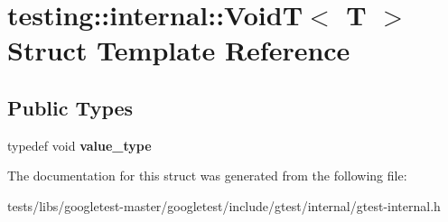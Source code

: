 \hypertarget{structtesting_1_1internal_1_1VoidT}{}\section{testing\+:\+:internal\+:\+:VoidT$<$ T $>$ Struct Template Reference}
\label{structtesting_1_1internal_1_1VoidT}
\subsection*{Public Types}
\begin{DoxyCompactItemize}
\item 
\mbox{\label{structtesting_1_1internal_1_1VoidT_a29e6a3f3989ddb47103944b350f1bec0}} 
typedef void {\bfseries value\+\_\+type}
\end{DoxyCompactItemize}


The documentation for this struct was generated from the following file\+:\begin{DoxyCompactItemize}
\item 
tests/libs/googletest-\/master/googletest/include/gtest/internal/gtest-\/internal.\+h\end{DoxyCompactItemize}
